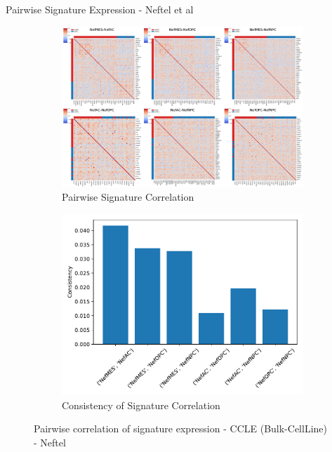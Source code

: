 \documentclass[aspectratio=169,9pt]{beamer}
\begin{document}
    \begin{frame}{Pairwise Signature Expression - Neftel et al}
        \begin{adjustwidth}{-5cm}{-5cm}
            \centering
            \begin{figure}
                \centering
                \begin{subfigure}[c]{0.7\textwidth}
                    \centering
                    \includegraphics[width=\textwidth]{CCLE_Corrplot_pair-Nef}
                    \caption{Pairwise Signature Correlation}
                \end{subfigure}
                \begin{subfigure}[c]{0.4\textwidth}
                    \centering
                    \includegraphics[width=\textwidth]{CCLE_Consistency_Nef}
                    \caption{Consistency of Signature Correlation}
                \end{subfigure}
                \caption{Pairwise correlation of signature expression - CCLE (Bulk-CellLine) - Neftel}
            \end{figure}
        \end{adjustwidth}
    \end{frame}
\end{document}
